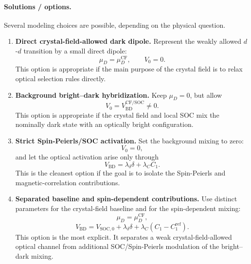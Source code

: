 \documentclass[11pt]{article}
\begin{document}
\paragraph{Solutions / options.}

Several modeling choices are possible, depending on the physical question.

\begin{enumerate}
    \item \textbf{Direct crystal-field-allowed dark dipole.}
    Represent the weakly allowed \(d\)-\(d\) transition by a small direct dipole:
    \begin{equation}
    \mu_D=\mu_D^{\mathrm{CF}},
    \qquad
    V_0=0.
    \end{equation}
    This option is appropriate if the main purpose of the crystal field is to relax optical selection rules directly.

    \item \textbf{Background bright--dark hybridization.}
    Keep \(\mu_D=0\), but allow
    \begin{equation}
    V_0=V_{\mathrm{BD}}^{\mathrm{CF/SOC}}\neq0.
    \end{equation}
    This option is appropriate if the crystal field and local SOC mix the nominally dark state with an optically bright configuration.

    \item \textbf{Strict Spin-Peierls/SOC activation.}
    Set the background mixing to zero:
    \begin{equation}
    V_0=0,
    \end{equation}
    and let the optical activation arise only through
    \begin{equation}
    V_{\mathrm{BD}}
    =
    \lambda_\delta\delta+\lambda_C C_1.
    \end{equation}
    This is the cleanest option if the goal is to isolate the Spin-Peierls and magnetic-correlation contributions.

    \item \textbf{Separated baseline and spin-dependent contributions.}
    Use distinct parameters for the crystal-field baseline and for the spin-dependent mixing:
    \begin{equation}
    \mu_D=\mu_D^{\mathrm{CF}},
    \end{equation}
    \begin{equation}
    V_{\mathrm{BD}}
    =
    V_{\mathrm{SOC},0}
    +
    \lambda_\delta\delta
    +
    \lambda_C(C_1-C_1^{\mathrm{ref}}).
    \end{equation}
    This option is the most explicit. It separates a weak crystal-field-allowed optical channel from additional SOC/Spin-Peierls modulation of the bright--dark mixing.
\end{enumerate}
\end{document}
